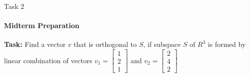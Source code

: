 \documentclass[aspectratio=169]{beamer}
\begin{document}
\begin{frame}[t]{Task 2}
    \framesubtitle{Midterm Preparation}
    \textbf{Task:} Find a vector $v$ that is orthogonal to $S$, if subspace $S$ of $R^3$ is formed by linear combination of vectors $v_1 = \begin{bmatrix}1\\2\\1\end{bmatrix}$ and $v_2 = \begin{bmatrix}2\\4\\2\end{bmatrix}$
    
\end{frame}
\end{document}
